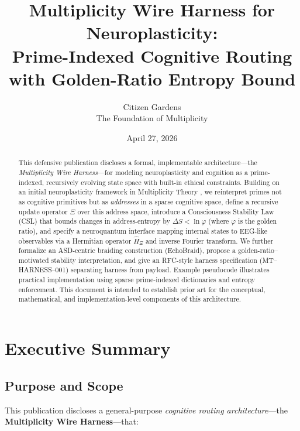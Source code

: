 \documentclass[11pt]{article}
\title{Multiplicity Wire Harness for Neuroplasticity:\\
Prime-Indexed Cognitive Routing with Golden-Ratio Entropy Bound}
\author{Citizen Gardens \\ The Foundation of Multiplicity}
\date{April 27, 2026}
\begin{document}
\maketitle

\begin{abstract}
This defensive publication discloses a formal, implementable architecture---the \emph{Multiplicity Wire Harness}---for modeling neuroplasticity and cognition as a prime-indexed, recursively evolving state space with built-in ethical constraints. Building on an initial neuroplasticity framework in Multiplicity Theory \cite{neuroplasticityMT}, we reinterpret primes not as cognitive primitives but as \emph{addresses} in a sparse cognitive space, define a recursive update operator $\Xi$ over this address space, introduce a Consciousness Stability Law (CSL) that bounds changes in address-entropy by $\Delta S < \ln \varphi$ (where $\varphi$ is the golden ratio), and specify a neuroquantum interface mapping internal states to EEG-like observables via a Hermitian operator $\hat{H}_\Xi$ and inverse Fourier transform. We further formalize an ASD-centric braiding construction (EchoBraid), propose a golden-ratio--motivated stability interpretation, and give an RFC-style harness specification (MT--HARNESS--001) separating harness from payload. Example pseudocode illustrates practical implementation using sparse prime-indexed dictionaries and entropy enforcement. This document is intended to establish prior art for the conceptual, mathematical, and implementation-level components of this architecture.
\end{abstract}
\newpage
\tableofcontents
\newpage
\section{Executive Summary}

\subsection{Purpose and Scope}

This publication discloses a general-purpose \emph{cognitive routing architecture}---the \textbf{Multiplicity Wire Harness}---that:
\end{document}
